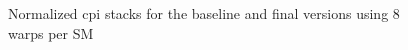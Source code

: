 

\begin{figure}
    \centering
    \caption[Normalized \acrshort{cpi} stacks when using 8 warps per \acrshort{sm}.]{Normalized \acrshort{cpi} stacks for the baseline and final versions using 8 warps per SM}
    \label{fig:norm_cpi_8w}
\end{figure}



